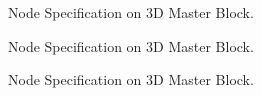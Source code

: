 \begin{figure}[ht!]
\caption{Node Specification on 3D Master Block.}
\label{blk3da}
\end{figure}

\begin{figure}[ht!]
\caption{Node Specification on 3D Master Block.}
\label{blk3db}
\end{figure}

\begin{figure}[ht!]
\caption{Node Specification on 3D Master Block.}
\label{blk3dc}
\end{figure}


\vspace*{3.1in}

\pagebreak
